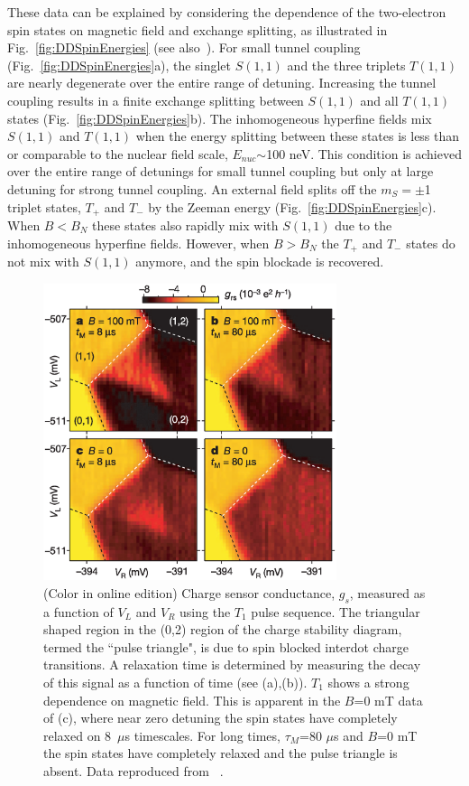 \documentclass[12pt,aps,nofootinbib]{revtex4-1}
\begin{document}
These data can be explained by considering the dependence of the
two-electron spin states on magnetic field and exchange splitting,
as illustrated in Fig.~\ref{fig:DDSpinEnergies} (see
also~\cite{jouravlev05,coish05}). For small tunnel coupling
(Fig.~\ref{fig:DDSpinEnergies}a), the singlet $S(1,1)$ and the three triplets $T(1,1)$ are nearly
degenerate over the entire range of detuning. Increasing the
tunnel coupling results in a finite exchange splitting between
$S(1,1)$ and all $T(1,1)$ states (Fig.~\ref{fig:DDSpinEnergies}b). The
inhomogeneous hyperfine fields mix $S(1,1)$ and $T(1,1)$ when the
energy splitting between these states is less than or comparable
to the nuclear field scale, $E_{nuc}$$\sim$100 neV. This condition
is achieved over the entire range of detunings for small tunnel
coupling but only at large detuning for strong tunnel coupling. An
external field splits off the $m_S=\pm$1 triplet states, $T_+$ and
$T_-$ by the Zeeman energy (Fig.~\ref{fig:DDSpinEnergies}c). When
$B<B_{N}$ these states also rapidly mix with $S(1,1)$ due to the
inhomogeneous hyperfine fields. However, when $B>B_{N}$ the
$T_+$ and $T_-$ states do not mix with $S(1,1)$ anymore, and
the spin blockade is recovered.

\begin{figure}[htb]
\includegraphics[width=8.6cm]{hanson_fig39.eps}
\caption{(Color in online edition) Charge sensor conductance, $g_s$,
measured as a function of $V_L$ and $V_R$ using the $T_1$ pulse
sequence. The triangular shaped region in the (0,2) region of the
charge stability diagram, termed the ``pulse triangle", is due to
spin blocked interdot charge transitions. A relaxation time is
determined by measuring the decay of this signal as a function of
time (see (a),(b)). $T_1$ shows a strong dependence on magnetic
field. This is apparent in the $B$=0 mT data of (c), where near
zero detuning the spin states have completely relaxed on 8~$\mu$s
timescales. For long times, $\tau_M$=80 $\mu$s and $B$=0 mT the
spin states have completely relaxed and the pulse triangle is
absent. Data reproduced from ~\textcite{johnson05}.}
\label{Fig:Johnson:Triangle}
\end{figure}
\end{document}
